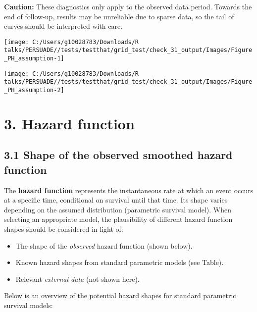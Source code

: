\documentclass[
]{article}
\providecommand{\tightlist}{%
  \setlength{\itemsep}{0pt}\setlength{\parskip}{0pt}}
\begin{document}
\textbf{Caution:} These diagnostics only apply to the observed data
period. Towards the end of follow-up, results may be unreliable due to
sparse data, so the tail of curves should be interpreted with care.

\clearpage

\begin{flushleft}\texttt{[image: C:/Users/g10028783/Downloads/R talks/PERSUADE//tests/testthat/grid\_test/check\_31\_output/Images/Figure\_PH\_assumption-1]} \end{flushleft}

\begin{flushleft}\texttt{[image: C:/Users/g10028783/Downloads/R talks/PERSUADE//tests/testthat/grid\_test/check\_31\_output/Images/Figure\_PH\_assumption-2]} \end{flushleft}

\clearpage

\section{3. Hazard function}\label{hazard-function}

\subsection{3.1 Shape of the observed smoothed hazard
function}\label{shape-of-the-observed-smoothed-hazard-function}

The \textbf{hazard function} represents the instantaneous rate at which
an event occurs at a specific time, conditional on survival until that
time. Its shape varies depending on the assumed distribution (parametric
survival model). When selecting an appropriate model, the plausibility
of different hazard function shapes should be considered in light of:

\begin{itemize}
\tightlist
\item
  The shape of the \emph{observed} hazard function (shown below).
\item
  Known hazard shapes from standard parametric models (see Table).
\item
  Relevant \emph{external data} (not shown here).
\end{itemize}

Below is an overview of the potential hazard shapes for standard
parametric survival models:
\end{document}
